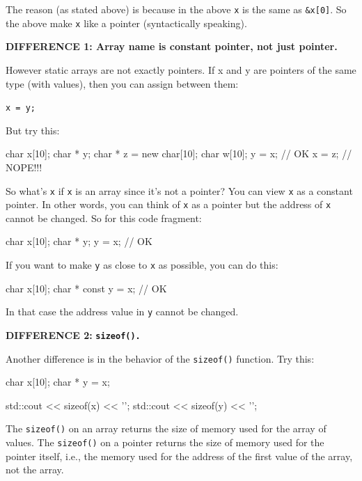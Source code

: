 The reason (as stated above) is because in the above \texttt{x} is the same as \texttt{\&x[0]}. So the above make \texttt{x} like a pointer (syntactically speaking).

\textbf{DIFFERENCE 1: Array name is constant pointer, not just pointer.}

However static arrays are not exactly pointers. If x and y are pointers of the same type (with values), then you can assign between them:

\verb!x = y;!

But try this:

\begin{consolethree}[escapeinside=||]
char x[10];
char * y;
char * z = new char[10];
char w[10];
y = x; // OK
x = z; // NOPE!!!
\end{consolethree}

So what's \texttt{x} if \texttt{x} is an array since it's not a pointer? You can view \texttt{x} as a constant pointer. In other words, you can think of \texttt{x} as a pointer but the address of \texttt{x} cannot be changed. So for this code fragment:

\begin{consolethree}[escapeinside=||]
char x[10];
char * y;
y = x; // OK
\end{consolethree}

If you want to make \texttt{y} as close to \texttt{x} as possible, you can do this:

\begin{consolethree}[escapeinside=||]
char x[10];
char * const y = x; // OK
\end{consolethree}

In that case the address value in \texttt{y} cannot be changed.

\textbf{DIFFERENCE 2:} \texttt{\textbf{sizeof().}}

Another difference is in the behavior of the \texttt{sizeof()} function. Try this:

\begin{consolethree}[escapeinside=||]
char x[10];
char * y = x;

std::cout << sizeof(x) << '\n';
std::cout << sizeof(y) << '\n';
\end{consolethree}

The \texttt{sizeof()} on an array returns the size of memory used for the array of values. The \texttt{sizeof()} on a pointer returns the size of memory used for the pointer itself, i.e., the memory used for the address of the first value of the array, not the array.


